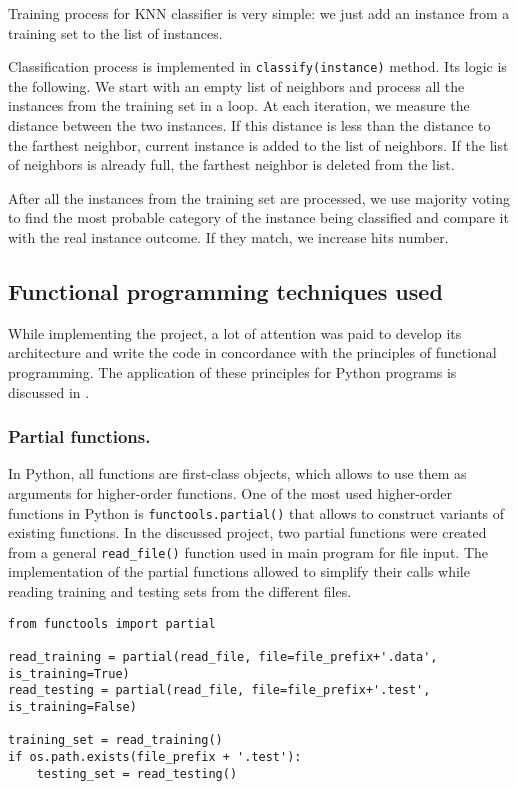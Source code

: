 \documentclass{llncs}
\begin{document}
Training process for KNN classifier is very simple: we just add an instance from a training set to the list of instances.

Classification process is implemented in \lstinline{classify(instance)} method. Its logic is the following. We start with an empty list of neighbors and process all the instances from the training set in a loop. At each iteration, we measure the distance between the two instances. If this distance is less than the distance to the farthest neighbor, current instance is added to the list of neighbors. If the list of neighbors is already full, the farthest neighbor is deleted from the list. 

After all the instances from the training set are processed, we use majority voting to find the most probable category of the instance being classified and compare it with the real instance outcome. If they match, we increase hits number.

\subsection{Functional programming techniques used}

While implementing the project, a lot of attention was paid to develop its architecture and write the code in concordance with the principles of functional programming. The application of these principles for Python programs is discussed in \cite{Kuchling}\cite{Mertz}.

\subsubsection{Partial functions.}

In Python, all functions are first-class objects, which allows to use them as arguments for higher-order functions. One of the most used higher-order functions in Python is \lstinline{functools.partial()} that allows to construct variants of existing functions. In the discussed project, two partial functions were created from a general \lstinline{read_file()} function used in main program for file input. The implementation of the partial functions allowed to simplify their calls while reading training and testing sets from the different files. 

\begin{lstlisting}[caption = Application of partial functions.]
from functools import partial

read_training = partial(read_file, file=file_prefix+'.data', is_training=True)
read_testing = partial(read_file, file=file_prefix+'.test', is_training=False)

training_set = read_training()
if os.path.exists(file_prefix + '.test'):
	testing_set = read_testing()
\end{lstlisting}
\end{document}
